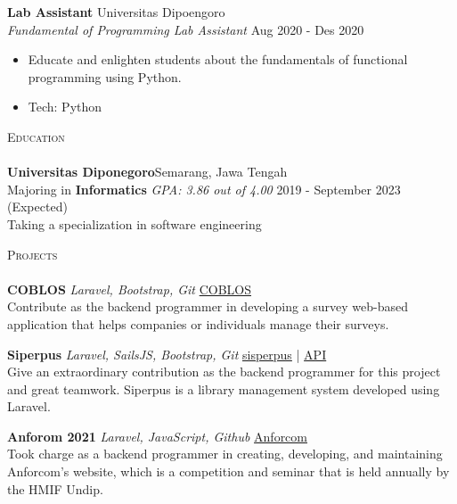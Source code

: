 \documentclass[a4paper]{article}
\newcommand{\lineunder} {
    \vspace*{-8pt} \\
    \hspace*{-18pt} \hrulefill \\
}
\newcommand{\header} [1] {
    {\hspace*{-18pt}\vspace*{6pt} \textsc{#1}}
    \vspace*{-6pt} \lineunder
}
\begin{document}
\textbf{Lab Assistant} \hfill Universitas Dipoengoro\\
\textit{Fundamental of Programming Lab Assistant} \hfill Aug 2020 - Des 2020\\
\vspace{-1mm}
\begin{itemize} \itemsep 1pt
	\item Educate and enlighten students about the fundamentals of functional programming using Python.
	\item Tech: Python
\end{itemize}

\header{Education}
\textbf{Universitas Diponegoro}\hfill Semarang, Jawa Tengah\\
Majoring in \textbf{Informatics} \textit{GPA: 3.86 out of 4.00} \hfill 2019 - September 2023 (Expected)\\
Taking a specialization in software engineering
\vspace{2mm}

\header{Projects}
{\textbf{COBLOS}} {\sl Laravel, Bootstrap, Git} \hfill \href{https://coblos.herokuapp.com/}{COBLOS}\\
Contribute as the backend programmer in developing a survey web-based application that helps companies or individuals manage their surveys.\\
\vspace*{2mm}

{\textbf{Siperpus}} {\sl Laravel, SailsJS, Bootstrap, Git} \hfill \href{http://sisperpus.herokuapp.com/}{sisperpus} | \href{https://pbp-siperpus.herokuapp.com/}{API}\\
Give an extraordinary contribution as the backend programmer for this project and great teamwork. Siperpus is a library management system developed using Laravel. \\
\vspace*{2mm}

{\textbf{Anforom 2021}} {\sl Laravel, JavaScript, Github} \hfill \href{https://anforcom.com}{Anforcom}\\
Took charge as a backend programmer in creating, developing, and maintaining Anforcom's website, which is a competition and seminar that is held annually by the HMIF Undip.\\
\vspace*{2mm}

\end{document}
